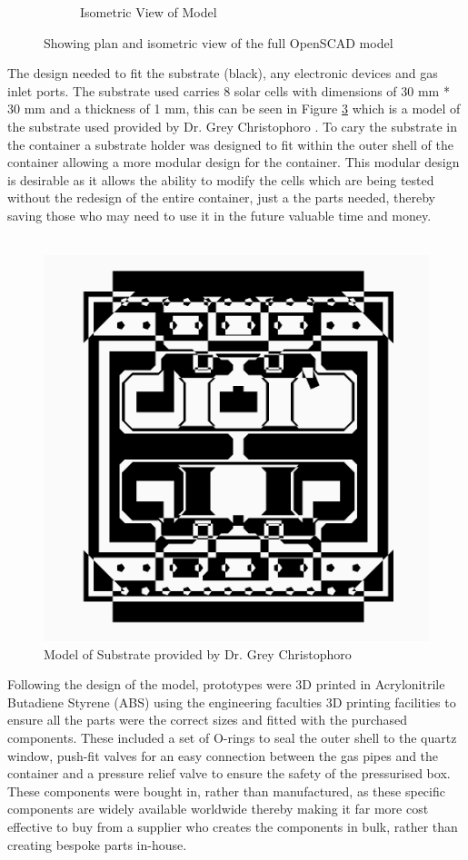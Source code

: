 \documentclass[a4paper,11pt]{article}
\begin{document}
\begin{figure}[h]
\begin{subfigure}{0.5\textwidth}
\caption{Isometric View of Model}
\label{fig:subim2}
\end{subfigure}
\caption{Showing plan and isometric view of the full OpenSCAD model\label{fig:model}}
\label{fig:image2}
\end{figure}
\noindent The design needed to fit the substrate (black), any electronic devices and gas inlet ports. The substrate used carries 8 solar cells with dimensions of 30 mm * 30 mm and a thickness of 1 mm, this can be seen in Figure \ref{fig:substrate} which is a model of the substrate used provided by Dr. Grey Christophoro . To cary the substrate in the container a substrate holder was designed to fit within the outer shell of the container allowing a more modular design for the container. This modular design is desirable as it allows the ability to modify the cells which are being tested without the redesign of the entire container, just a the parts needed, thereby saving those who may need to use it in the future valuable time and money. 
\\
\\
\begin{figure} 
\includegraphics[width=\linewidth]{fig2}
\caption{Model of Substrate provided by Dr. Grey Christophoro\label{fig:substrate}}
\end{figure}\noindent Following the design of the model, prototypes were 3D printed in Acrylonitrile Butadiene Styrene (ABS) using the engineering faculties 3D printing facilities to ensure all the parts were the correct sizes and fitted with the purchased components.  These included a set of O-rings to seal the outer shell to the quartz window, push-fit valves for an easy connection between the gas pipes and the container and a pressure relief valve to ensure the safety of the pressurised box. These components were bought in, rather than manufactured, as these specific components are widely available worldwide thereby making it far more cost effective to buy from a supplier who creates the components in bulk, rather than creating bespoke parts in-house. 
\end{document}
